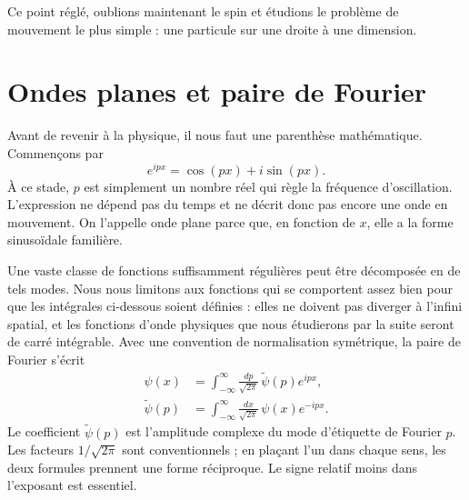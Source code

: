 \begin{classroomqa}
\end{classroomqa}

Ce point réglé, oublions maintenant le spin et étudions le problème de mouvement le plus simple : une particule sur une droite à une dimension.

\section{Ondes planes et paire de Fourier}

Avant de revenir à la physique, il nous faut une parenthèse mathématique. Commençons par
\begin{equation}
e^{ipx}=\cos(px)+i\sin(px).
\end{equation}
À ce stade, \(p\) est simplement un nombre réel qui règle la fréquence d’oscillation. L’expression ne dépend pas du temps et ne décrit donc pas encore une onde en mouvement. On l’appelle onde plane parce que, en fonction de \(x\), elle a la forme sinusoïdale familière.

Une vaste classe de fonctions suffisamment régulières peut être décomposée en de tels modes. Nous nous limitons aux fonctions qui se comportent assez bien pour que les intégrales ci-dessous soient définies : elles ne doivent pas diverger à l’infini spatial, et les fonctions d’onde physiques que nous étudierons par la suite seront de carré intégrable. Avec une convention de normalisation symétrique, la paire de Fourier s’écrit
\begin{align}
\psi(x)
&=
\int_{-\infty}^{\infty}
\frac{dp}{\sqrt{2\pi}}\,
\widetilde{\psi}(p)e^{ipx},
\label{eq:l9-fourier-forward}\\
\widetilde{\psi}(p)
&=
\int_{-\infty}^{\infty}
\frac{dx}{\sqrt{2\pi}}\,
\psi(x)e^{-ipx}.
\label{eq:l9-fourier-inverse}
\end{align}
Le coefficient \(\widetilde{\psi}(p)\) est l’amplitude complexe du mode d’étiquette de Fourier \(p\). Les facteurs \(1/\sqrt{2\pi}\) sont conventionnels ; en plaçant l’un dans chaque sens, les deux formules prennent une forme réciproque. Le signe relatif moins dans l’exposant est essentiel.

